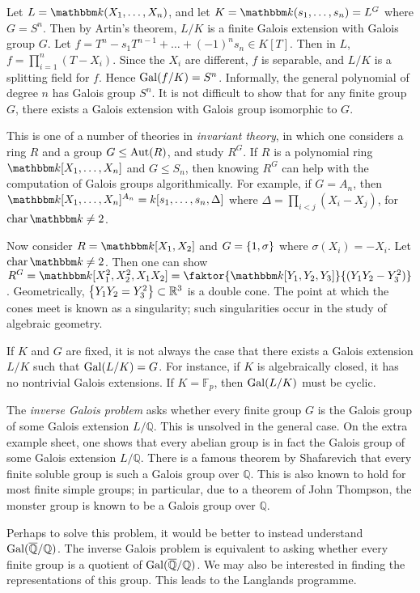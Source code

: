 \begin{example}
	Let \( L = \mathbbm k(X_1, \dots, X_n) \), and let \( K = \mathbbm k(s_1, \dots, s_n) = L^G \) where \( G = S^n \).
	Then by Artin's theorem, \( L/K \) is a finite Galois extension with Galois group \( G \).
	Let \( f = T^n - s_1 T^{n-1} + \dots + (-1)^n s_n \in K[T] \).
	Then in \( L \), \( f = \prod_{i=1}^n (T - X_i) \).
	Since the \( X_i \) are different, \( f \) is separable, and \( L / K \) is a splitting field for \( f \).
	Hence \( \operatorname{Gal}(f/K) = S^n \).
	Informally, the general polynomial of degree \( n \) has Galois group \( S^n \).
	It is not difficult to show that for any finite group \( G \), there exists a Galois extension with Galois group isomorphic to \( G \).

	This is one of a number of theories in \emph{invariant theory}, in which one considers a ring \( R \) and a group \( G \leq \operatorname{Aut}(R) \), and study \( R^G \).
	If \( R \) is a polynomial ring \( \mathbbm k[X_1, \dots, X_n] \) and \( G \leq S_n \), then knowing \( R^G \) can help with the computation of Galois groups algorithmically.
	For example, if \( G = A_n \), then \( \mathbbm k[X_1, \dots, X_n]^{A_n} = k[s_1, \dots, s_n, \Delta] \) where \( \Delta = \prod_{i < j} (X_i - X_j) \), for \( \fchar \mathbbm k \neq 2 \).

	Now consider \( R = \mathbbm k[X_1, X_2] \) and \( G = \qty{1, \sigma} \) where \( \sigma(X_i) = -X_i \).
	Let \( \fchar \mathbbm k \neq 2 \).
	Then one can show \( R^G = \mathbbm k[X_1^2, X_2^2, X_1 X_2] = \faktor{\mathbbm k[Y_1, Y_2, Y_3]}{(Y_1 Y_2 - Y_3^2)} \).
	Geometrically, \( \qty{Y_1 Y_2 = Y_3^2} \subset \mathbb R^3 \) is a double cone.
	The point at which the cones meet is known as a singularity; such singularities occur in the study of algebraic geometry.

	If \( K \) and \( G \) are fixed, it is not always the case that there exists a Galois extension \( L / K \) such that \( \operatorname{Gal}(L/K) = G \).
	For instance, if \( K \) is algebraically closed, it has no nontrivial Galois extensions.
	If \( K = \mathbb F_p \), then \( \operatorname{Gal}(L/K) \) must be cyclic.

	The \emph{inverse Galois problem} asks whether every finite group \( G \) is the Galois group of some Galois extension \( L / \mathbb Q \).
	This is unsolved in the general case.
	On the extra example sheet, one shows that every abelian group is in fact the Galois group of some Galois extension \( L / \mathbb Q \).
	There is a famous theorem by Shafarevich that every finite soluble group is such a Galois group over \( \mathbb Q \).
	This is also known to hold for most finite simple groups; in particular, due to a theorem of John Thompson, the monster group is known to be a Galois group over \( \mathbb Q \).

	Perhaps to solve this problem, it would be better to instead understand \( \operatorname{Gal}(\overline{\mathbb Q}/\mathbb Q) \).
	The inverse Galois problem is equivalent to asking whether every finite group is a quotient of \( \operatorname{Gal}(\overline{\mathbb Q}/\mathbb Q) \).
	We may also be interested in finding the representations of this group.
	This leads to the Langlands programme.
\end{example}
